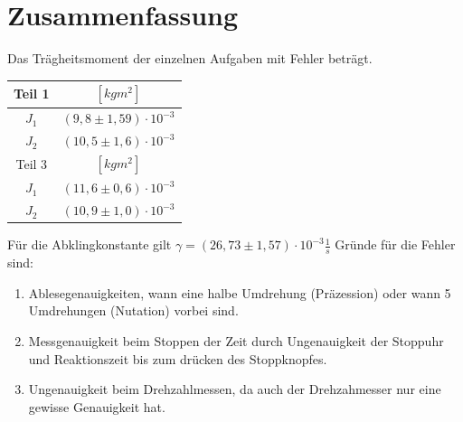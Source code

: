 \documentclass[12pt,a4paper,]{scrreprt}
\begin{document}
	\chapter{Zusammenfassung}
    Das Trägheitsmoment der einzelnen Aufgaben mit Fehler beträgt.
    \begin{center}
    \begin{tabular}{c|c}
    	Teil 1 &  $[kgm^2]$\\ \hline \hline
        $J_1$ & $(9,8\pm 1,59) \cdot 10^{-3}$\\
        $J_2$ & $(10,5\pm 1,6) \cdot 10^{-3}$\\ \hline
        Teil 3 & $[kgm^2]$\\ \hline \hline
        $J_1$ & $(11,6\pm 0,6) \cdot 10^{-3}$\\
        $J_2$ & $(10,9\pm 1,0) \cdot 10^{-3}$\\
        
    \end{tabular}
    \end{center}
   	Für die Abklingkonstante gilt $\gamma = (26,73\pm 1,57) \cdot 10^{-3} \frac{1}{s}$
    Gründe für die Fehler sind:
    \begin{enumerate}
    \item Ablesegenauigkeiten, wann eine halbe Umdrehung (Präzession) oder wann 5 Umdrehungen (Nutation) vorbei sind.
    \item Messgenauigkeit beim Stoppen der Zeit durch Ungenauigkeit der Stoppuhr und Reaktionszeit bis zum drücken des Stoppknopfes.
    \item Ungenauigkeit beim Drehzahlmessen, da auch der Drehzahmesser nur eine gewisse Genauigkeit hat. 
    \end{enumerate}
 
    
	\pagebreak
\end{document}
